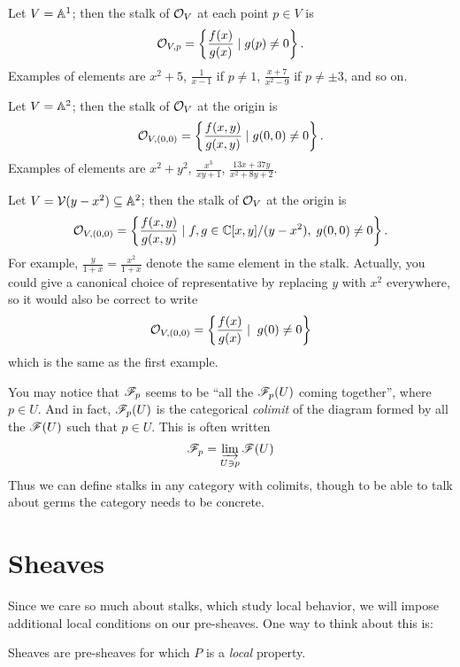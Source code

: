 \begin{example}
	\listhack
	\begin{enumerate}[(a)]
		\ii Let $V = \mathbb A^1$; then the stalk of $\mathcal O_V$
		at each point $p \in V$ is
		\[ \mathcal O_{V,p}
			= \left\{ \frac{f(x)}{g(x)} \mid g(p) \neq 0 \right\}. \]
		Examples of elements are $x^2+5$, $\frac{1}{x-1}$ if $p \neq 1$,
		$\frac{x+7}{x^2-9}$ if $p \neq \pm 3$, and so on.

		\ii Let $V = \mathbb A^2$;
		then the stalk of $\mathcal O_V$ at the origin is
		\[ \mathcal O_{V, (0,0)}
			= \left\{ \frac{f(x,y)}{g(x,y)} \mid g(0,0) \neq 0 \right\}. \]
		Examples of elements are $x^2+y^2$,
		$\frac{x^3}{xy+1}$, $\frac{13x+37y}{x^2+8y+2}$.

		\ii Let $V = \mathcal V(y-x^2) \subseteq \mathbb A^2$;
		then the stalk of $\mathcal O_V$ at the origin is
		\[ \mathcal O_{V, (0,0)}
			= \left\{ \frac{f(x,y)}{g(x,y)} \mid f,g \in \mathbb C[x,y] / (y-x^2),
				\; g(0,0) \neq 0 \right\}. \]
		For example, $\frac{y}{1+x} = \frac{x^2}{1+x}$
		denote the same element in the stalk.
		Actually, you could give a canonical choice of representative
		by replacing $y$ with $x^2$ everywhere, so it would also be
		correct to write
		\[ \mathcal O_{V, (0,0)}
			= \left\{ \frac{f(x)}{g(x)} \mid \; g(0) \neq 0 \right\} \]
		which is the same as the first example.
	\end{enumerate}
\end{example}

\begin{remark}
	You may notice that $\mathscr F_p$ seems to be
	``all the $\mathscr F_p(U)$ coming together'', where $p \in U$.
	And in fact, $\mathscr F_p(U)$ is the categorical \emph{colimit}
	of the diagram formed by all the $\mathscr F(U)$ such that $p \in U$.
	This is often written
	\[ \mathscr F_p = \varinjlim_{U \ni p} \mathscr F(U) \]
	Thus we can define stalks in any category with colimits,
	though to be able to talk about germs the category needs
	to be concrete.
\end{remark}

\section{Sheaves}

Since we care so much about stalks, which study local behavior,
we will impose additional local conditions on our pre-sheaves.
One way to think about this is:
\begin{moral}
	Sheaves are pre-sheaves for which $P$ is a \emph{local} property.
\end{moral}

